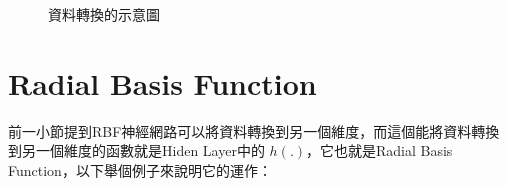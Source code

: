 \begin{figure}[htbp!]
	\centering


	\caption{資料轉換的示意圖}
	\label{Fig:rbf_transfer}
\end{figure}



\section{Radial Basis Function}
前一小節提到RBF神經網路可以將資料轉換到另一個維度，而這個能將資料轉換到另一個維度的函數就是Hiden Layer中的 \(h(.)\)，它也就是Radial Basis Function，以下舉個例子來說明它的運作：

